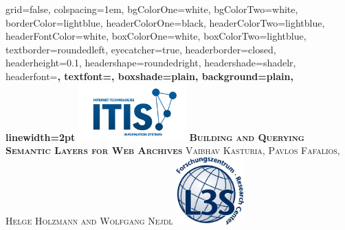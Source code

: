 \documentclass[portrait,final,a0paper,fontscale=0.277]{baposter}
\begin{document}


\begin{poster}%
  {
  grid=false,
  colspacing=1em,
  bgColorOne=white,
  bgColorTwo=white,
  borderColor=lightblue,
  headerColorOne=black,
  headerColorTwo=lightblue,
  headerFontColor=white,
  boxColorOne=white,
  boxColorTwo=lightblue,
  textborder=roundedleft,
  eyecatcher=true,
  headerborder=closed,
  headerheight=0.1\textheight,
  headershape=roundedright,
  headershade=shadelr,
  headerfont=\Large\bf\textsc, %
  textfont={\setlength{\parindent}{1.5em}},
  boxshade=plain,
  background=plain,
  linewidth=2pt
  }
  {\includegraphics[height=6em]{images/ITIS_Logo}} 
  {\bf\textsc{Building and Querying Semantic Layers for Web Archives}\vspace{0.5em}}
  {\textsc{Vaibhav Kasturia, Pavlos Fafalios, Helge Holzmann and Wolfgang Nejdl }}
  {%
    \includegraphics[height=7.0em]{images/l3s_logo}
  }

    \newcommand{\colouredcircle}{%
      \tikz{\useasboundingbox (-0.2em,-0.32em) rectangle(0.2em,0.32em); \draw[draw=black,fill=lightblue,line width=0.03em] (0,0) circle(0.18em);}}


\end{poster}
\end{document}
